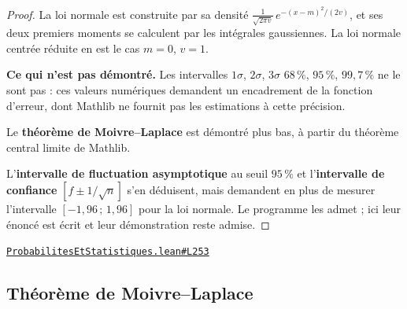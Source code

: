 \documentclass[11pt,a4paper]{article}
\theoremstyle{definition}
\theoremstyle{plain}
\newcommand{\source}[2]{\par\smallskip\noindent\hfill{\footnotesize\href{#1}{\texttt{#2}}}\par\smallskip}
\begin{document}
\begin{proof}
La loi normale est construite par sa densité
$\frac{1}{\sqrt{2\pi v}}\,e^{-(x-m)^{2}/(2v)}$, et ses deux premiers moments se calculent
par les intégrales gaussiennes. La loi normale centrée réduite en est le cas $m = 0$,
$v = 1$.

\medskip\noindent
\textbf{Ce qui n'est pas démontré.} Les intervalles $1\sigma$, $2\sigma$, $3\sigma$ \textemdash{}
$68\,\%$, $95\,\%$, $99{,}7\,\%$ \textemdash{} ne le sont pas : ces valeurs numériques
demandent un encadrement de la fonction d'erreur, dont Mathlib ne fournit pas les
estimations à cette précision.

\medskip\noindent
Le \textbf{théorème de Moivre--Laplace} est démontré plus bas, à partir du théorème central
limite de Mathlib.

\medskip\noindent
L'\textbf{intervalle de fluctuation asymptotique} au seuil $95\,\%$ et l'\textbf{intervalle
de confiance} $[f \pm 1/\sqrt{n}]$ s'en déduisent, mais demandent en plus de mesurer
l'intervalle $[-1{,}96\,;\,1{,}96]$ pour la loi normale. Le programme les admet ; ici leur
énoncé est écrit et leur démonstration reste admise.
\end{proof}
\source{https://github.com/Commutator-IO/learn-lean/blob/main/courses/02-lycee/09-probabilites-et-statistiques/ProbabilitesEtStatistiques.lean\#L253}{ProbabilitesEtStatistiques.lean\#L253}

\subsection{Théorème de Moivre--Laplace}
\end{document}
